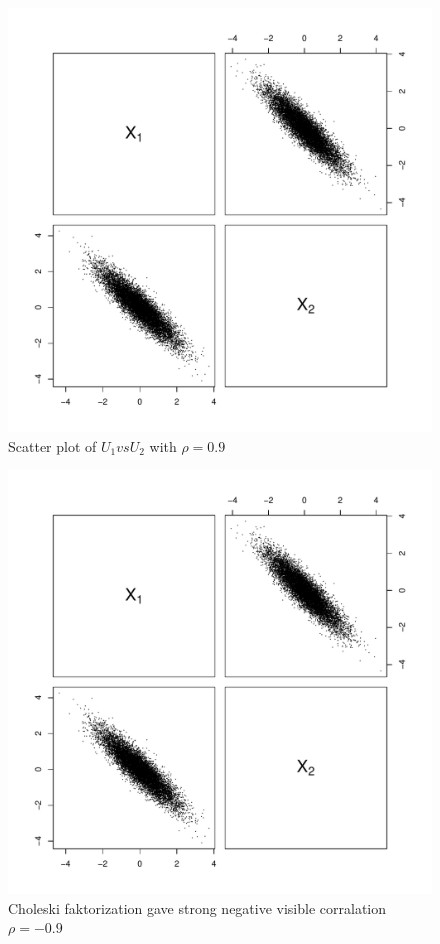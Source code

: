 \documentclass[a4paper, 11pt]{article}
\begin{document}
\begin{figure}[H]
  \centering
  \includegraphics[scale=0.5,page=6]{Rplots4.pdf}
  \caption{Scatter plot of $U_1 vs U_2$ with $\rho = 0.9$}
  \label{u1u2pos}
\end{figure}


\begin{figure}[H]
  \centering
  \includegraphics[scale=0.5,page=1]{Rplots4.pdf}
  \caption{Choleski faktorization gave strong negative visible corralation $\rho = -0.9$}
  \label{x1x2neg}
\end{figure}
\end{document}
